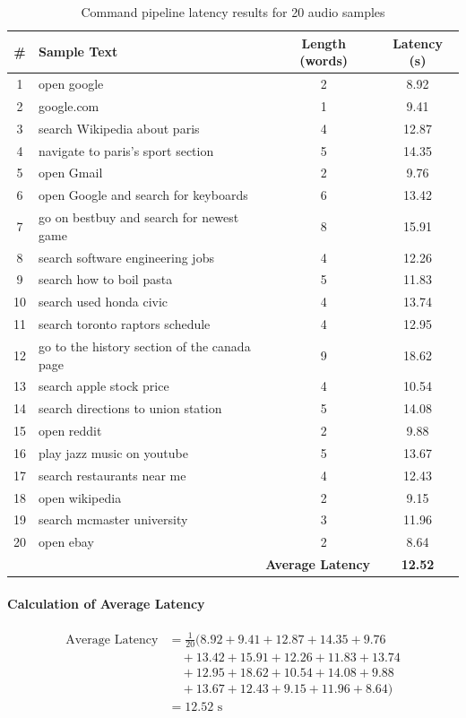 \documentclass[12pt, titlepage]{article}
\begin{document}
\begin{table}[H]
\centering
\caption{Command pipeline latency results for 20 audio samples}
\begin{tabular}{|c|p{7cm}|c|c|}
\hline
\textbf{\#} & \textbf{Sample Text} & \textbf{Length (words)} & \textbf{Latency (s)} \\ \hline
1  & open google & 2 & 8.92 \\ \hline
2  & google.com & 1 & 9.41 \\ \hline
3  & search Wikipedia about paris & 4 & 12.87 \\ \hline
4  & navigate to paris's sport section & 5 & 14.35 \\ \hline
5  & open Gmail & 2 & 9.76 \\ \hline
6  & open Google and search for keyboards & 6 & 13.42 \\ \hline
7  & go on bestbuy and search for newest game & 8 & 15.91 \\ \hline
8  & search software engineering jobs & 4 & 12.26 \\ \hline
9  & search how to boil pasta & 5 & 11.83 \\ \hline
10 & search used honda civic & 4 & 13.74 \\ \hline
11 & search toronto raptors schedule & 4 & 12.95 \\ \hline
12 & go to the history section of the canada page & 9 & 18.62 \\ \hline
13 & search apple stock price & 4 & 10.54 \\ \hline
14 & search directions to union station & 5 & 14.08 \\ \hline
15 & open reddit & 2 & 9.88 \\ \hline
16 & play jazz music on youtube & 5 & 13.67 \\ \hline
17 & search restaurants near me & 4 & 12.43 \\ \hline
18 & open wikipedia & 2 & 9.15 \\ \hline
19 & search mcmaster university & 3 & 11.96 \\ \hline
20 & open ebay & 2 & 8.64 \\ \hline
\multicolumn{3}{|r|}{\textbf{Average Latency}} & \textbf{12.52} \\ \hline
\end{tabular}
\label{tab:command-pipeline-latency}
\end{table}

\paragraph{Calculation of Average Latency}
\[
\begin{aligned}
\text{Average Latency}
&= \frac{1}{20}(8.92 + 9.41 + 12.87 + 14.35 + 9.76 \\
&\quad + 13.42 + 15.91 + 12.26 + 11.83 + 13.74 \\
&\quad + 12.95 + 18.62 + 10.54 + 14.08 + 9.88 \\
&\quad + 13.67 + 12.43 + 9.15 + 11.96 + 8.64) \\
&= 12.52 \text{ s}
\end{aligned}
\]
\end{document}
